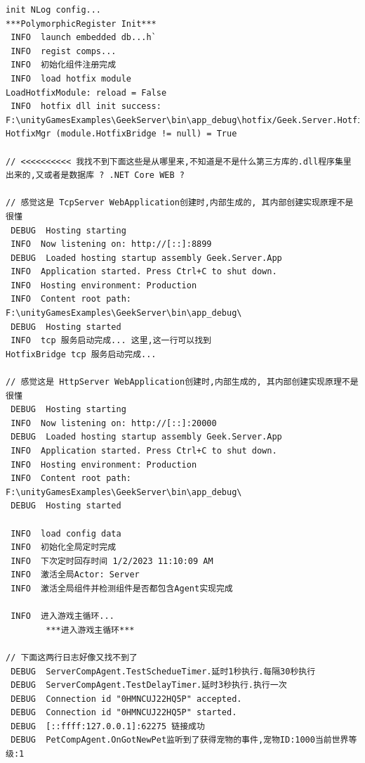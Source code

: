 \documentclass[9pt, b5paper]{article}
\begin{document}
\begin{verbatim}
init NLog config...
***PolymorphicRegister Init***
 INFO  launch embedded db...h`
 INFO  regist comps...
 INFO  初始化组件注册完成
 INFO  load hotfix module
LoadHotfixModule: reload = False
 INFO  hotfix dll init success: F:\unityGamesExamples\GeekServer\bin\app_debug\hotfix/Geek.Server.Hotfix.dll
HotfixMgr (module.HotfixBridge != null) = True

// <<<<<<<<<< 我找不到下面这些是从哪里来,不知道是不是什么第三方库的.dll程序集里出来的,又或者是数据库 ? .NET Core WEB ?

// 感觉这是 TcpServer WebApplication创建时,内部生成的, 其内部创建实现原理不是很懂
 DEBUG  Hosting starting
 INFO  Now listening on: http://[::]:8899
 DEBUG  Loaded hosting startup assembly Geek.Server.App
 INFO  Application started. Press Ctrl+C to shut down.
 INFO  Hosting environment: Production
 INFO  Content root path: F:\unityGamesExamples\GeekServer\bin\app_debug\
 DEBUG  Hosting started
 INFO  tcp 服务启动完成... 这里,这一行可以找到
HotfixBridge tcp 服务启动完成...

// 感觉这是 HttpServer WebApplication创建时,内部生成的, 其内部创建实现原理不是很懂
 DEBUG  Hosting starting
 INFO  Now listening on: http://[::]:20000
 DEBUG  Loaded hosting startup assembly Geek.Server.App
 INFO  Application started. Press Ctrl+C to shut down.
 INFO  Hosting environment: Production
 INFO  Content root path: F:\unityGamesExamples\GeekServer\bin\app_debug\
 DEBUG  Hosting started

 INFO  load config data
 INFO  初始化全局定时完成
 INFO  下次定时回存时间 1/2/2023 11:10:09 AM
 INFO  激活全局Actor: Server
 INFO  激活全局组件并检测组件是否都包含Agent实现完成

 INFO  进入游戏主循环...
        ***进入游戏主循环***

// 下面这两行日志好像又找不到了
 DEBUG  ServerCompAgent.TestSchedueTimer.延时1秒执行.每隔30秒执行
 DEBUG  ServerCompAgent.TestDelayTimer.延时3秒执行.执行一次
 DEBUG  Connection id "0HMNCUJ22HQ5P" accepted.
 DEBUG  Connection id "0HMNCUJ22HQ5P" started.
 DEBUG  [::ffff:127.0.0.1]:62275 链接成功
 DEBUG  PetCompAgent.OnGotNewPet监听到了获得宠物的事件,宠物ID:1000当前世界等级:1


\end{verbatim}
\end{document}
